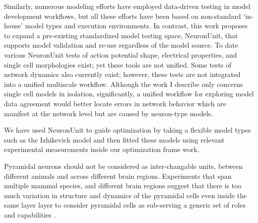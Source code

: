 Similarly, numerous modeling efforts have employed data-driven testing in model development workflows, but all these efforts have been based on non-standard ‘in-house’ model types and execution environments. In contrast, this work proposes to expand a pre-existing standardized model testing space, NeuronUnit, that supports model validation and re-use regardless of the model source. To date various NeuronUnit tests of action potential shape, electrical properties, and single cell morphologies exist; yet these tools are not unified. Some tests of network dynamics also currently exist; however, these tests are not integrated into a unified multiscale workflow. Although the work I describe only concerns single cell models in isolation, significantly, a unified workflow for exploring model data agreement would better locate errors in network behavior which are manifest at the network level but are caused by neuron-type models.

We have used NeuronUnit to guide optimization by taking a flexible model types such as the Izhikevich model and then fitted these models using relevant experimental measurements inside our optimization frame work.


Pyramidal neurons should not be considered as inter-changable units, between different animals and across different brain regions. Experiments that span multiple mammal species, and different brain regions suggest that there is too much variation in structure and dynamics of the pyramidal cells even inside the same layer layer to consider pyramidal cells as sub-serving a generic set of roles and capabilities \cite{luebke2017pyramidal}. %

